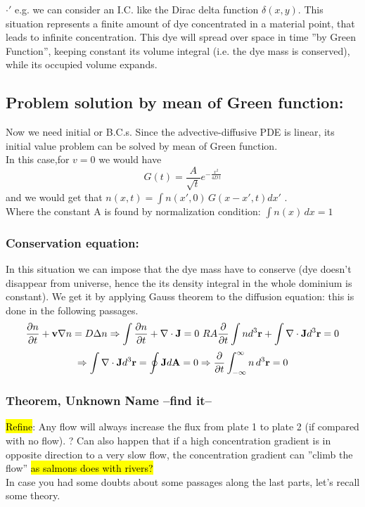 \documentclass[a4paper,11pt]{article}
\newcommand{\RA}{\Rightarrow}
\newcommand{\dive}{\nabla \cdot}
\newcommand{\cic}[1]{\mathbf{#1}}
\begin{document}
$\cdot'$ e.g. we can consider an I.C. like the Dirac delta function $\delta(x,y)$.
This situation represents a finite amount of dye concentrated in a material point, that leads to infinite concentration. This dye will spread over space in time ''by Green Function'', keeping constant its volume integral (i.e. the dye mass is conserved), while its occupied volume expands.



\subsection{Problem solution by mean of Green function:}
Now we need initial or B.C.s. Since the advective-diffusive PDE is linear, its initial value problem can be solved by mean of Green function. \\
In this case,for $v=0$ we would have 
\[ G(t)= \frac{A}{\sqrt{t}} e^{-\frac{x^2}{4D\,t}} \] 
and we would get that $n(x,t)=\int n(x',0)\,G(x-x',t)dx'$ .\\
Where the constant A is found by normalization condition: $\int n(x)\,dx=1$

\subsubsection{Conservation equation:}
In this situation we can impose that the dye mass have to conserve (dye doesn't disappear from universe, hence the its density integral in the whole dominium is constant). We get it by applying Gauss theorem to the diffusion equation: this is done in the following passages.\\
\[\pdv{n}{t}+\cic{v} \nabla n=D \Delta n \RA \int \pdv{n}{t}+\dive \cic{J}=0 \ RA
\pdv{}{t} \int n d^3 \cic{r}+\int \dive \cic{J} d^3 \cic{r}=0\]
\[ \RA \int \dive \cic{J} d^3 \cic{r}= \oint \cic{J} d\cic{A}=0 \RA 
\pdv{}{t}\int_{-\infty}^{\infty} n\,d^3\cic{r}=0  \]

\subsubsection{Theorem, Unknown Name --find it--}
\hl{Refine}: Any flow will always increase the flux from plate 1 to plate 2 (if compared with no flow). 
? Can also happen that if a high concentration gradient is in opposite direction to a very slow flow, the concentration gradient can ''climb the flow'' \hl{as salmons does with rivers?} \\
In case you had some doubts about some passages along the last parts, let's recall some theory. \\
\end{document}
